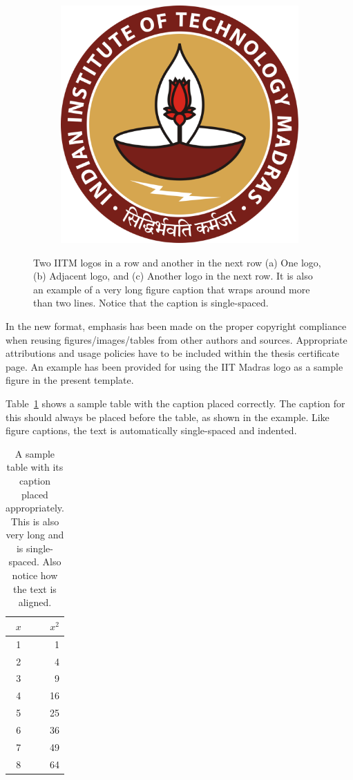 \begin{figure}[htpb]
	\begin{subfigure}{1\textwidth}
		\centering
		\includegraphics[width=0.45\linewidth]{iitmlogo.eps}
		\caption{}
		\label{fig:iitmc}
\end{subfigure}
    \caption {Two IITM logos in a row and another in the next row (a) One logo, (b) Adjacent logo, and (c) Another logo in the next row. It is also an example of a very long figure caption that wraps around more than two lines. Notice that the caption is single-spaced.}
\label{fig:iitm}
\end{figure}

In the new format, emphasis has been made on the proper copyright compliance when reusing figures/images/tables from other authors and sources. Appropriate attributions and usage policies have to be included within the thesis certificate page. An example has been provided for using the IIT Madras logo as a sample figure in the present template.

Table~\ref{tab:sample} shows a sample table with the caption placed correctly. The caption for this should always be placed before the table, as shown in the example. Like figure captions, the text is automatically single-spaced and indented.

\begin{table}[htbp]
  \caption{A sample table with its caption placed appropriately. This is also very long and is single-spaced. Also notice how the text is aligned.}
  \begin{center}
  \begin{tabular}[c]{|c|r|} \hline
    $x$ & $x^2$ \\ \hline
    1  &  1   \\
    2  &  4  \\
    3  &  9  \\
    4  &  16  \\
    5  &  25  \\
    6  &  36  \\
    7  &  49  \\
    8  &  64  \\ \hline
  \end{tabular}
  \label{tab:sample}
  \end{center}
\end{table}


